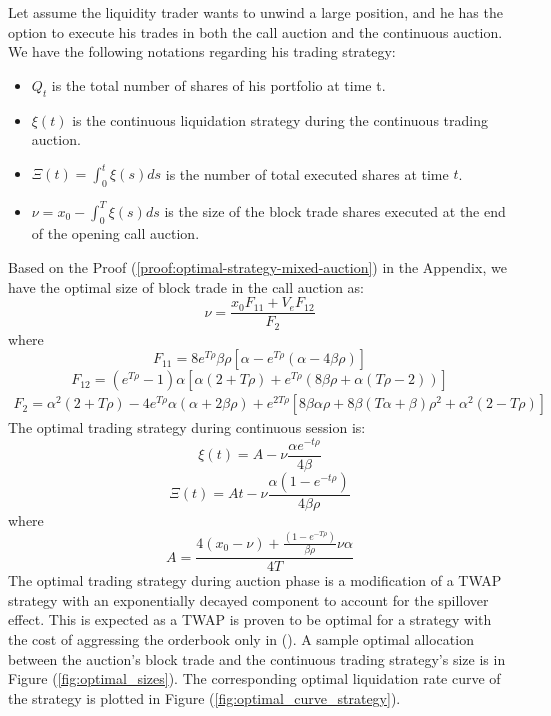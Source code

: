 Let assume the liquidity trader wants to unwind a large position, and he has the option to execute his trades in both the call auction and the continuous auction. We have the following notations regarding his trading strategy:

\begin{itemize}
  \item $Q_t$ is the total number of shares of his portfolio at time t.
  \item $\xi(t)$ is the continuous liquidation strategy during the continuous trading auction.
  \item $\Xi(t)=\int_0^t \xi(s) ds$ is the number of total executed shares at time $t$.
  \item $\nu=x_0 - \int_0^T \xi(s) ds$ is the size of the block trade shares executed at the end of the opening call auction.
\end{itemize}

Based on the Proof (\ref{proof:optimal-strategy-mixed-auction}) in the Appendix, we have the optimal size of block trade in the call auction as:
\[
  \nu = \frac{x_0 F_{11} + V_e F_{12}}{F_2}
\]
where
\[
  F_{11} = 8 e^{T \rho} \beta \rho [\alpha - e^{T \rho} (\alpha - 4 \beta \rho)]
\]
\[
  F_{12} = (e^{T \rho}-1) \alpha [\alpha (2+T \rho) + e^{T \rho} (8 \beta \rho + \alpha (T \rho - 2 ))]
\]
\[
  \begin{split}
    F_2 = \alpha^2 (2 + T \rho) - 4 e^{T \rho} \alpha (\alpha + 2 \beta \rho)
    + e^{2 T \rho} [8 \beta \alpha \rho + 8 \beta (T \alpha + \beta) \rho^2 + \alpha^2 (2 - T \rho)]
  \end{split}
\]
The optimal trading strategy during continuous session is:
\[
  \xi(t) = A - \nu \frac{\alpha e^{-t \rho}}{4 \beta}
\]
\[
  \Xi(t) = A t - \nu \frac{\alpha (1- e^{-t \rho})}{4 \beta \rho}
\]
where
\[
  A = \frac{4 (x_0 - \nu) + \frac{(1 - e^{-T \rho})}{\beta \rho} \nu \alpha} {4 T}
\]
The optimal trading strategy during auction phase is a modification of a TWAP strategy with an exponentially decayed component to account for the spillover effect. This is expected as a TWAP is proven to be optimal for a strategy with the cost of aggressing the orderbook only in (\cite{Ho1981}). A sample optimal allocation between the auction's block trade and the continuous trading strategy's size is in Figure (\ref{fig:optimal_sizes}). The corresponding optimal liquidation rate curve of the strategy is plotted in Figure (\ref{fig:optimal_curve_strategy}).



